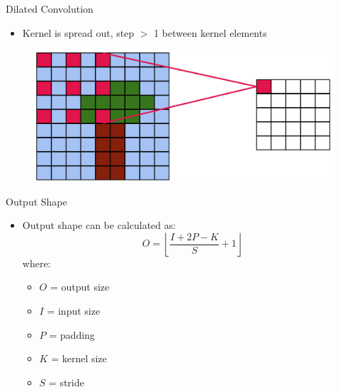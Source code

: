 \begin{frame}{Dilated Convolution}
    \begin{itemize}
        \item Kernel is spread out, step $>$ 1 between kernel elements
    \end{itemize}


    \begin{figure}
        \centering
        \includegraphics[width=1.0\textwidth,height=0.8\textheight,keepaspectratio]{images/cnn/dilated.png}
    \end{figure}

\end{frame}

\begin{frame}{Output Shape}
    \begin{itemize}
        \item Output shape can be calculated as:
        \[
        O = \left\lfloor \frac{I + 2P - K}{S} + 1 \right\rfloor
        \]
        where:
        \begin{itemize}
            \item \(O\) = output size
            \item \(I\) = input size
            \item \(P\) = padding
            \item \(K\) = kernel size
            \item \(S\) = stride
        \end{itemize}
    \end{itemize}
    
\end{frame}